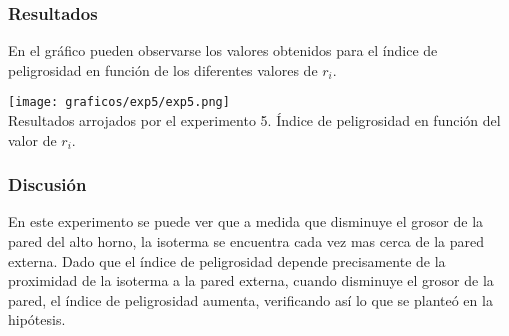       \subsubsection*{Resultados}

        En el gráfico pueden observarse los valores obtenidos para el índice de peligrosidad en función de los diferentes valores de $r_i$.

          \begin{minipage}{\textwidth} \begin{center}
            \texttt{[image: graficos/exp5/exp5.png]} \\
            {\small Resultados arrojados por el experimento 5. Índice de peligrosidad en función del valor de $r_i$.}
          \end{center} \end{minipage}

      \subsubsection*{Discusión}
        En este experimento se puede ver que a medida que disminuye el grosor de la pared del alto horno, la isoterma se encuentra cada vez mas cerca de la pared externa. Dado que el índice de peligrosidad depende precisamente de la proximidad de la isoterma a la pared externa, cuando disminuye el grosor de la pared, el índice de peligrosidad aumenta, verificando así lo que se planteó en la hipótesis.
